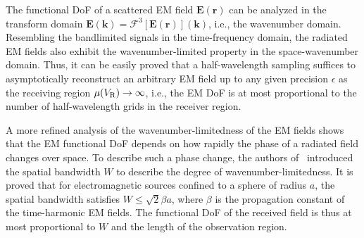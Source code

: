 \documentclass[journal,twocolumn]{IEEEtran}
\begin{document}
The functional DoF of a scattered EM field ${\bm E}({\bm r})$ can be analyzed in the transform domain ${\bm E}({\bm k}) = \mathcal{F}^3[{\bm E}({\bm r})]({\bm k})$, i.e., the wavenumber domain. Resembling the bandlimited signals in the time-frequency domain, the radiated EM fields also exhibit the wavenumber-limited property in the space-wavenumber domain. 
Thus, it can be easily proved that a half-wavelength sampling suffices to asymptotically reconstruct an arbitrary EM field up to any given precision $\epsilon$ as the receiving region $\mu(V_{\rm R})\to\infty$, i.e., the EM DoF is at most proportional to the number of half-wavelength grids in the receiver region. 

A more refined analysis of the wavenumber-limitedness of the EM fields shows that the EM functional DoF depends on how rapidly the phase of a radiated field changes over space. 
To describe such a phase change, the authors of~\cite{bucci1987spatial} introduced the spatial bandwidth $W$ to describe the degree of wavenumber-limitedness. 
It is proved that for electromagnetic sources confined to a sphere of radius $a$, the spatial bandwidth satisfies $W\leq \sqrt{2}\beta a$, where $\beta$ is the propagation constant of the time-harmonic EM fields. 
The functional DoF of the received field is thus at most proportional to $W$ and the length of the observation region. 

\end{document}
